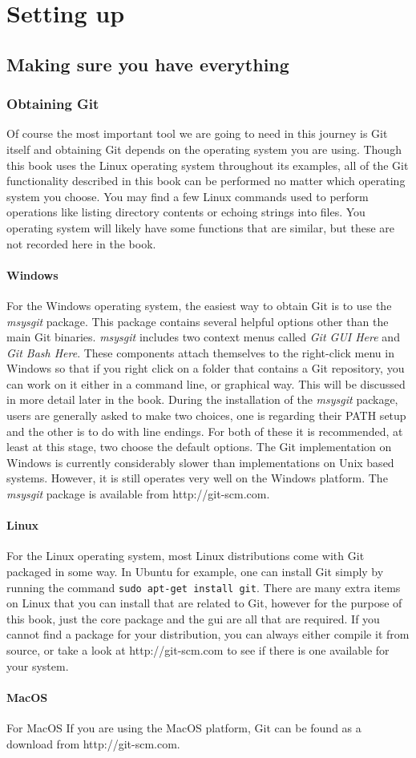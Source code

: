 \cleardoublepage
\chapter{Setting up}
\section{Making sure you have everything}
\subsection{Obtaining Git}
Of course the most important tool we are going to need in this journey is Git itself and obtaining Git depends on the operating system you are using.
Though this book uses the Linux operating system throughout its examples,
all of the Git functionality described in this book can be performed no matter which operating system you choose.
You may find a few Linux commands used to perform operations like listing directory contents or echoing strings into files.
You operating system will likely have some functions that are similar, but these are not recorded here in the book.

\subsubsection{Windows}
For the Windows operating system, the easiest way to obtain Git is to use the \emph{msysgit} package.
This package contains several helpful options other than the main Git binaries.
\emph{msysgit} includes two context menus called \emph{Git GUI Here} and \emph{Git Bash Here}.
These components attach themselves to the right-click menu in Windows so that if you right click on a folder that contains a Git repository,
you can work on it either in a command line, or graphical way.
This will be discussed in more detail later in the book.
During the installation of the \emph{msysgit} package, users are generally asked to make two choices, one is regarding their PATH setup and the other is to do with line endings.
For both of these it is recommended, at least at this stage, two choose the default options.
The Git implementation on Windows is currently considerably slower than implementations on Unix based systems.
However, it is still operates very well on the Windows platform.
The \emph{msysgit} package is available from http://git-scm.com.

\subsubsection{Linux}
For the Linux operating system, most Linux distributions come with Git packaged in some way.
In Ubuntu for example, one can install Git simply by running the command \texttt{sudo apt-get install git}.
There are many extra items on Linux that you can install that are related to Git, however for the purpose of this book, just the core package and the gui are all that are required.
If you cannot find a package for your distribution, you can always either compile it from source, or take a look at http://git-scm.com to see if there is one available for your system.

\subsubsection{MacOS}
For MacOS
If you are using the MacOS platform, Git can be found as a download from http://git-scm.com.
